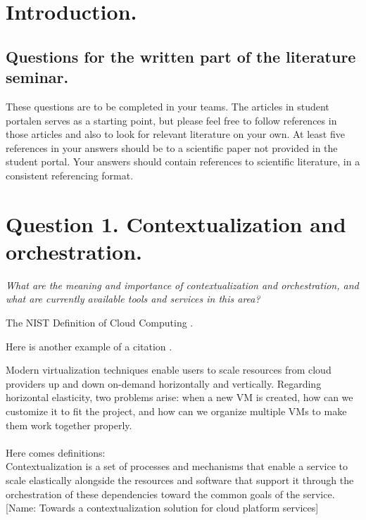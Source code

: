 \documentclass[a4paper,12pt]{article}
\begin{document}
\newpage
\section*{Introduction.}
\subsection*{Questions for the written part of the literature seminar.}
These questions are to be completed in your teams. The articles in student portalen
serves as a starting point, but please feel free to follow references in those articles
and also to look for relevant literature on your own. At least five references in your
answers should be to a scientific paper not provided in the student portal. Your
answers should contain references to scientific literature, in a consistent referencing
format.

\section{Question 1. Contextualization and orchestration.}
\textit{What are the meaning and importance of contextualization and orchestration,
and what are currently available tools and services in this area?}

The NIST Definition of Cloud Computing \cite{nist}.

Here is another example of a citation \cite{fog}.

Modern virtualization techniques enable users to scale resources from cloud providers up and down on-demand horizontally and vertically. Regarding horizontal elasticity, two problems arise: when a new VM is created, how can we customize it to fit the project, and how can we organize multiple VMs to make them work together properly. \\\\
Here comes definitions: \\
Contextualization is a set of processes and mechanisms that enable a service to scale elastically alongside the resources and software that support it through the orchestration of these dependencies toward the common goals of the service.[Name: Towards a contextualization solution for cloud platform services]
\end{document}
